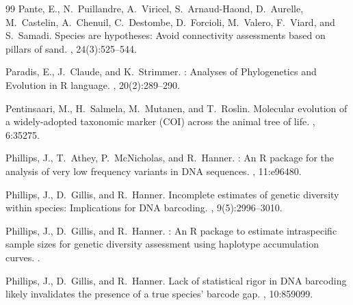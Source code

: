 \documentclass[12pt]{article}
\begin{document}
\begin{thebibliography}{99}
Pante, E., N.~Puillandre, A.~Viricel, S.~Arnaud-Haond, D.~Aurelle, M.~Castelin,
  A.~Chenuil, C.~Destombe, D.~Forcioli, M.~Valero, F.~Viard, and
  S.~Samadi\leavevmode\nopagebreak{}.
\newblock Species are hypotheses: {A}void connectivity assessments based on
  pillars of sand.
, 24(3):525--544.

Paradis, E., J.~Claude, and K.~Strimmer\leavevmode\nopagebreak{}.
: {A}nalyses of {P}hylogenetics and {E}volution in {R} language.
, 20(2):289--290.

Pentinsaari, M., H.~Salmela, M.~Mutanen, and
  T.~Roslin\leavevmode\nopagebreak{}.
\newblock Molecular evolution of a widely-adopted taxonomic marker ({COI})
  across the animal tree of life.
, 6:35275.

Phillips, J., T.~Athey, P.~McNicholas, and
  R.~Hanner\leavevmode\nopagebreak{}.
: An {R} package for the analysis of very low frequency variants
  in {DNA} sequences.
, 11:e96480.

Phillips, J., D.~Gillis, and R.~Hanner\leavevmode\nopagebreak{}.
\newblock Incomplete estimates of genetic diversity within species:
  {I}mplications for {DNA} barcoding.
, 9(5):2996--3010.

Phillips, J., D.~Gillis, and R.~Hanner\leavevmode\nopagebreak{}.
: {A}n {R} package to estimate intraspecific sample sizes
  for genetic diversity assessment using haplotype accumulation curves.
.

Phillips, J., D.~Gillis, and R.~Hanner\leavevmode\nopagebreak{}.
\newblock Lack of statistical rigor in {DNA} barcoding likely invalidates the
  presence of a true species' barcode gap.
, 10:859099.


\end{thebibliography}
\end{document}
